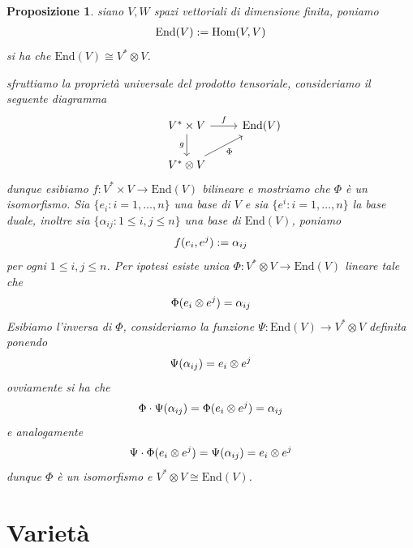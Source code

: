 \documentclass[oneside, 11pt]{amsbook}
\makeatletter
\newcommand{\0}{{(0)}}
\newcommand{\3}{{(3)}}
\theoremstyle{colonplain}
\newtheorem{prop}[thm]{Proposizione}
\theoremstyle{colondefinition}
\theoremstyle{colonremark}
\numberwithin{equation}{chapter}
\renewcommand{\proofname}{Dimostrazione}
\renewenvironment{proof}[1][\proofname]{\par
  \pushQED{\qed}%
  \normalfont \topsep6\p@\@plus6\p@\relax
  \trivlist
  \item[\hskip\labelsep\bfseries #1:]\ignorespaces
}{%
  \popQED\endtrivlist\@endpefalse
}
\makeatother
\begin{document}
\begin{prop} siano $V, W$ spazi vettoriali di dimensione finita, poniamo
\begin{align}
    \mathrm{End}(V) := \mathrm{Hom}(V, V) \notag
\end{align}
si ha che $\mathrm{End}(V) \cong V^* \otimes V$. \\

\begin{proof} sfruttiamo la \textit{proprietà universale del prodotto tensoriale}, consideriamo il seguente diagramma \\
\[
\begin{tikzcd}
&V^* \times V \arrow[r,"f"] \arrow[d,"g", swap] & \mathrm{End}(V) \\
&V^* \otimes V \arrow[ur, "\Phi", swap] 
\end{tikzcd}
\]
dunque esibiamo $f : V^* \times V \longrightarrow \mathrm{End}(V)$ bilineare e mostriamo che
$\Phi$ è un isomorfismo. Sia $\{ e_i : i = 1, \dots, n \}$ una base di $V$ e sia $\{ e^i : i = 1, \dots, n \}$ la base duale, inoltre sia $\{ \alpha_{ij} : 1 \leq i, j \leq n \}$ una base di $\mathrm{End}(V)$, poniamo
\begin{align}
    f(e_i, e^j) := \alpha_{ij} \notag
\end{align}
per ogni $1 \leq i, j \leq n$. Per ipotesi esiste unica $\Phi : V^* \otimes V \longrightarrow \mathrm{End}(V)$ lineare tale che
\begin{align}
    \Phi(e_i \otimes e^j) = \alpha_{ij} \notag
\end{align}
Esibiamo l'inversa di $\Phi$, consideriamo la funzione $\Psi : \mathrm{End}(V) \longrightarrow V^* \otimes V$ definita ponendo
\begin{align}
    \Psi (\alpha_{ij}) = e_i \otimes e^j \notag
\end{align}
ovviamente si ha che
\begin{align}
    \Phi \cdot \Psi (\alpha_{ij}) = \Phi (e_i \otimes e^j) = \alpha_{ij} \notag
\end{align}
e analogamente
\begin{align}
    \Psi \cdot \Phi (e_i \otimes e^j) = \Psi(\alpha_{ij}) = e_i \otimes e^j \notag
\end{align}
dunque $\Phi$ è un isomorfismo e $V^* \otimes V \cong \mathrm{End}(V)$. \end{proof}
\end{prop}


\chapter{Varietà}
\end{document}
